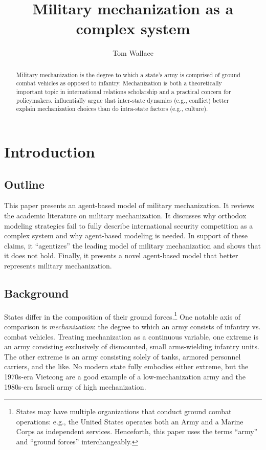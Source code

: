 \documentclass{article}
\title{Military mechanization as a complex system}
\author{Tom Wallace}
\begin{document}
\maketitle

\begin{abstract}

	Military mechanization is the degree to which a state's army is comprised of
	ground combat vehicles as opposed to infantry. Mechanization is both a 
	theoretically important topic in international relations scholarship and a practical 
	concern for policymakers. \citet{sechser2010army} influentially argue that
	inter-state dynamics (e.g., conflict) better explain mechanization choices than do
	intra-state factors (e.g., culture). 

\end{abstract}

\newpage

\section{Introduction}

\subsection{Outline}

This paper presents an agent-based model of military mechanization. It
reviews the academic literature on military mechanization. It discusses why
orthodox modeling strategies fail to fully describe international security competition
as a complex system and why agent-based modeling is needed. In support of these
claims, it ``agentizes'' the leading model of military mechanization and shows
that it does not hold. Finally, it presents a
novel agent-based model that better represents military mechanization. 

\subsection{Background}

States differ in the composition of their ground forces.\footnote{States may have multiple organizations that
conduct ground combat operations: e.g., the United States operates both an Army
and a Marine Corps as independent services. Henceforth, this paper uses the
terms ``army'' and ``ground forces'' interchangeably.} One notable axis of comparison 
is \textit{mechanization}: the degree to which an army consists of infantry 
vs. combat vehicles. Treating mechanization as a continuous variable, 
one extreme is an army consisting exclusively of dismounted, small 
arms-wielding infantry units. The other extreme is an army consisting 
solely of tanks, armored personnel carriers, and the like.
No modern state fully embodies either extreme, but the 1970s-era Vietcong are
a good example of a low-mechanization army and the 1980s-era Israeli army of
high mechanization.
\end{document}
